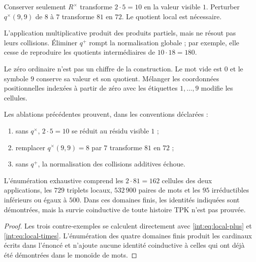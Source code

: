 \begin{definition}
Conserver seulement $R^\times$ transforme $2\cdot5=10$ en la valeur visible $1$.
Perturber $q^\times(9,9)$ de $8$ à $7$ transforme $81$ en $72$. Le quotient
local est nécessaire.
\end{definition}

\begin{definition}
L'application multiplicative produit des produits partiels, mais ne résout pas leurs collisions.
Éliminer $q^+$ rompt la normalisation globale ; par exemple, elle cesse de reproduire
les quotients intermédiaires de $10\cdot18=180$.
\end{definition}

\begin{definition}
Le zéro ordinaire n'est pas un chiffre de la construction. Le mot vide est
$0$ et le symbole $9$ conserve sa valeur et son quotient. Mélanger les coordonnées
positionnelles indexées à partir de zéro avec les étiquettes $1,\ldots,9$ modifie les
cellules.
\end{definition}

\begin{proposition}
\label{int:pf84:D10}
Les ablations précédentes prouvent, dans les conventions déclarées :
\begin{enumerate}
  \item sans \(q^\times\), \(2\cdot5=10\) se réduit au résidu visible \(1\) ;
  \item remplacer \(q^\times(9,9)=8\) par \(7\) transforme \(81\) en \(72\) ;
  \item sans \(q^+\), la normalisation des collisions additives échoue.
\end{enumerate}
L'énumération exhaustive comprend les \(2\cdot81=162\) cellules des deux
applications, les \(729\) triplets locaux, \(532\,900\) paires de mots et
les \(95\) irréductibles inférieurs ou égaux à \(500\). Dans ces domaines finis,
les identités indiquées sont démontrées, mais la survie
coinductive de toute histoire TPK n'est pas prouvée.
\end{proposition}

\begin{proof}
Les trois contre-exemples se calculent directement avec
\eqref{int:eq:local-plus} et \eqref{int:eq:local-times}. L'énumération des quatre
domaines finis produit les cardinaux écrits dans l'énoncé et n'ajoute
aucune identité coinductive à celles qui ont déjà été démontrées dans le monoïde
de mots.
\end{proof}

